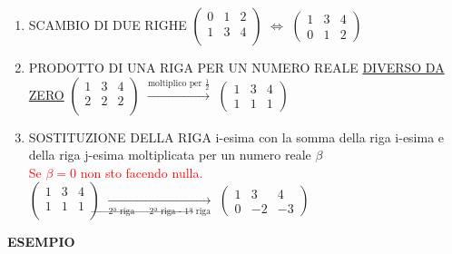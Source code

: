 \begin{enumerate}
	\item \textsf{\small SCAMBIO DI DUE RIGHE} \hfill
	\(
	\begin{pmatrix}
		0 & 1 & 2\\
		1 & 3 & 4\\
	\end{pmatrix}
	\)
	$\Leftrightarrow$
	\( 
	\begin{pmatrix}
		1 & 3 & 4 \\
		0 & 1 & 2
	\end{pmatrix}
	\)
	\item \textsf{\small PRODOTTO DI UNA RIGA PER UN NUMERO REALE \underline{DIVERSO DA ZERO}} \centering
	\(
	\begin{pmatrix}
		1 & 3 & 4\\
		2 & 2 & 2\\
	\end{pmatrix}
	\)
	$\overset{\text{moltiplico per } \frac{1}{2}}{\rightarrow}$
	\( 
	\begin{pmatrix}
		1 & 3 & 4 \\
		1 & 1 & 1
	\end{pmatrix}
	\)
	\item \textsf{\small SOSTITUZIONE DELLA RIGA i-esima con la somma della riga i-esima e della riga j-esima moltiplicata per un numero reale $\beta$} \\
	\textcolor{red}{Se $\beta = 0$ non sto facendo nulla.} \\
	\(
	\begin{pmatrix}
		1 & 3 & 4\\
		1 & 1 & 1\\
	\end{pmatrix}
	\)
	$\underset{\text{2ª riga $\rightarrow$ 2ª riga - 1ª riga}}{\longrightarrow}$
	\( 
	\begin{pmatrix}
		1 & 3 & 4 \\
		0 & -2 & -3
	\end{pmatrix}
	\)
\end{enumerate}

\textbf{\small ESEMPIO}

